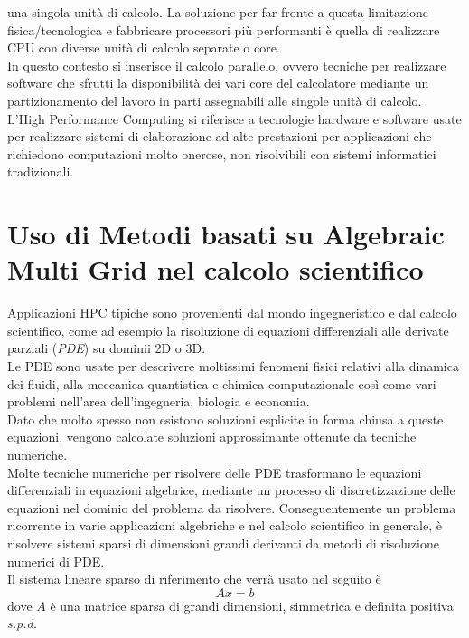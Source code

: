 una singola unità di calcolo.
\voidLine
La soluzione per far fronte a questa limitazione fisica/tecnologica e 
fabbricare processori più performanti è quella di realizzare CPU con diverse unità di calcolo separate o core.\\
In questo contesto si inserisce il calcolo parallelo, ovvero tecniche per realizzare software che 
sfrutti la disponibilità dei vari core del calcolatore mediante un partizionamento del lavoro in parti
assegnabili alle singole unità di calcolo.\\
\voidLine
L'High Performance Computing si riferisce a tecnologie hardware e software 
usate per realizzare sistemi di elaborazione ad alte prestazioni 
per applicazioni che richiedono computazioni molto onerose, non risolvibili con sistemi informatici tradizionali.\\

\section{Uso di Metodi basati su Algebraic Multi Grid nel calcolo scientifico} \label{chIntro:PDE_intro}
Applicazioni HPC tipiche sono provenienti dal mondo ingegneristico e dal calcolo scientifico,
come ad esempio la risoluzione di equazioni differenziali alle derivate parziali (\emph{PDE}) su dominii 2D o 3D.\\
Le PDE sono usate per descrivere moltissimi fenomeni fisici relativi alla
dinamica dei fluidi, alla meccanica quantistica e chimica computazionale %
così come vari problemi nell'area dell'ingegneria, biologia e economia.\\
Dato che molto spesso non esistono soluzioni esplicite in forma chiusa a queste equazioni,
vengono calcolate soluzioni approssimante ottenute da tecniche numeriche.\\ 
Molte tecniche numeriche per risolvere delle PDE trasformano le equazioni differenziali
in equazioni algebrice, mediante un processo di discretizzazione delle equazioni nel dominio del problema da risolvere.
Conseguentemente un problema ricorrente in varie applicazioni algebriche e nel calcolo scientifico in generale, 
è risolvere sistemi sparsi di dimensioni grandi derivanti da metodi di risoluzione numerici di PDE.\\
\voidLine
Il sistema lineare sparso di riferimento che verrà usato nel seguito è 
\begin{equation} \label{eq:1}
Ax=b
\end{equation}
dove $A$ è una matrice sparsa di grandi dimensioni,
simmetrica e definita positiva \emph{s.p.d.}\\
